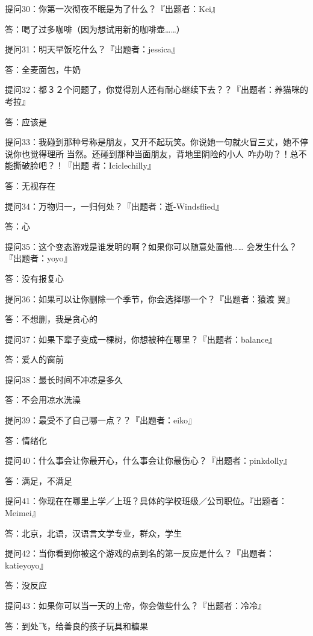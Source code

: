 \documentclass[12pt,a4paper]{article}
\def\blankrev{\vspace{1ex}}									%
\begin{document}
		\blankrev
		提问30：你第一次彻夜不眠是为了什么？『出题者：Kei』\par
		答：喝了过多咖啡（因为想试用新的咖啡壶……）

		\blankrev
		提问31：明天早饭吃什么？『出题者：jessica』\par
		答：全麦面包，牛奶

		\blankrev
		提问32：都３２个问题了，你觉得别人还有耐心继续下去？？『出题者：养猫咪的考拉』\par
		答：应该是

		\blankrev
		提问33：我碰到那种号称是朋友，又开不起玩笑。你说她一句就火冒三丈，她不停说你也觉得理所
				当然。还碰到那种当面朋友，背地里阴险的小人~咋办叻？！总不能撕破脸吧？！『出题
				者：Iciclechilly』\par
		答：无视存在

		\blankrev
		提问34：万物归一，一归何处？『出题者：逝-Windsflied』\par
		答：心

		\blankrev
		提问35：这个变态游戏是谁发明的啊？如果你可以随意处置他…… 会发生什么？ 『出题者：yoyo』\par
		答：没有报复心

		\blankrev
		提问36：如果可以让你删除一个季节，你会选择哪一个？『出题者：猿渡 翼』\par
		答：不想删，我是贪心的

		\blankrev
		提问37：如果下辈子变成一棵树，你想被种在哪里？『出题者：balance』\par
		答：爱人的窗前

		\blankrev
		提问38：最长时间不冲凉是多久\par
		答：不会用凉水洗澡

		\blankrev
		提问39：最受不了自己哪一点？？『出题者：eiko』\par
		答：情绪化

		\blankrev
		提问40：什么事会让你最开心，什么事会让你最伤心？『出题者：pinkdolly』\par
		答：满足，不满足

		\blankrev
		提问41：你现在在哪里上学／上班？具体的学校班级／公司职位。『出题者：Meimei』\par
		答：北京，北语，汉语言文学专业，群众，学生

		\blankrev
		提问42：当你看到你被这个游戏的点到名的第一反应是什么？『出题者：katieyoyo』\par
		答：没反应

		\blankrev
		提问43：如果你可以当一天的上帝，你会做些什么？『出题者：冷冷』\par
		答：到处飞，给善良的孩子玩具和糖果
\end{document}

